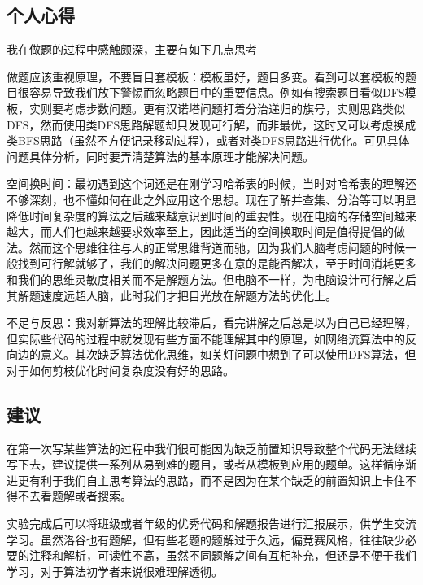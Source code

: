 \documentclass[supercite]{Experimental_Report}
\theoremstyle{definition}
\begin{document}
\subsection{个人心得}

我在做题的过程中感触颇深，主要有如下几点思考

做题应该重视原理，不要盲目套模板：模板虽好，题目多变。看到可以套模板的题目很容易导致我们放下警惕而忽略题目中的重要信息。例如有搜索题目看似DFS模板，实则要考虑步数问题。更有汉诺塔问题打着分治递归的旗号，实则思路类似DFS，然而使用类DFS思路解题却只发现可行解，而非最优，这时又可以考虑换成类BFS思路（虽然不方便记录移动过程），或者对类DFS思路进行优化。可见具体问题具体分析，同时要弄清楚算法的基本原理才能解决问题。

空间换时间：最初遇到这个词还是在刚学习哈希表的时候，当时对哈希表的理解还不够深刻，也不懂如何在此之外应用这个思想。现在了解并查集、分治等可以明显降低时间复杂度的算法之后越来越意识到时间的重要性。现在电脑的存储空间越来越大，而人们也越来越要求效率至上，因此适当的空间换取时间是值得提倡的做法。然而这个思维往往与人的正常思维背道而驰，因为我们人脑考虑问题的时候一般找到可行解就够了，我们的解决问题更多在意的是能否解决，至于时间消耗更多和我们的思维灵敏度相关而不是解题方法。但电脑不一样，为电脑设计可行解之后其解题速度远超人脑，此时我们才把目光放在解题方法的优化上。

不足与反思：我对新算法的理解比较滞后，看完讲解之后总是以为自己已经理解，但实际些代码的过程中就发现有些方面不能理解其中的原理，如网络流算法中的反向边的意义。其次缺乏算法优化思维，如关灯问题中想到了可以使用DFS算法，但对于如何剪枝优化时间复杂度没有好的思路。

\subsection{建议}

在第一次写某些算法的过程中我们很可能因为缺乏前置知识导致整个代码无法继续写下去，建议提供一系列从易到难的题目，或者从模板到应用的题单。这样循序渐进更有利于我们自主思考算法的思路，而不是因为在某个缺乏的前置知识上卡住不得不去看题解或者搜索。

实验完成后可以将班级或者年级的优秀代码和解题报告进行汇报展示，供学生交流学习。虽然洛谷也有题解，但有些老题的题解过于久远，偏竞赛风格，往往缺少必要的注释和解析，可读性不高，虽然不同题解之间有互相补充，但还是不便于我们学习，对于算法初学者来说很难理解透彻。

\nocite{*} %



\setcounter{secnumdepth}{0}
\appendix
\end{document}

